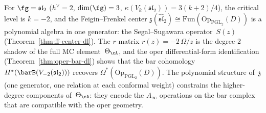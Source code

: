 \begin{remark}
For $\fg = \mathfrak{sl}_2$ ($h^\vee = 2$,
$\dim(\fg) = 3$,
$\kappa(V_k(\mathfrak{sl}_2)) = 3(k+2)/4$),
the critical level is $k = -2$, and the Feigin--Frenkel center
$\mathfrak{z}(\widehat{\mathfrak{sl}}_2) \cong
\mathrm{Fun}(\mathrm{Op}_{\mathrm{PGL}_2}(D))$
is a polynomial algebra in one generator: the Segal--Sugawara
operator~$S(z)$
(Theorem~\ref{thm:ff-center-dl}).
The $r$-matrix $r(z) = -2\,\Omega/z$ is the degree-$2$ shadow of
the full MC element~$\Theta_{\cA}$, and
the oper differential-form identification
(Theorem~\ref{thm:oper-bar-dl}) shows that the bar
cohomology $H^*(\barB(V_{-2}(\mathfrak{sl}_2)))$
recovers $\Omega^*(\mathrm{Op}_{\mathrm{PGL}_2}(D))$.
The polynomial structure of~$\mathfrak{z}$ (one generator, one
relation at each conformal weight) constrains the higher-degree
components of~$\Theta_{\cA}$: they encode the $A_\infty$
operations on the bar complex that are compatible with the
oper geometry.
\end{remark}

